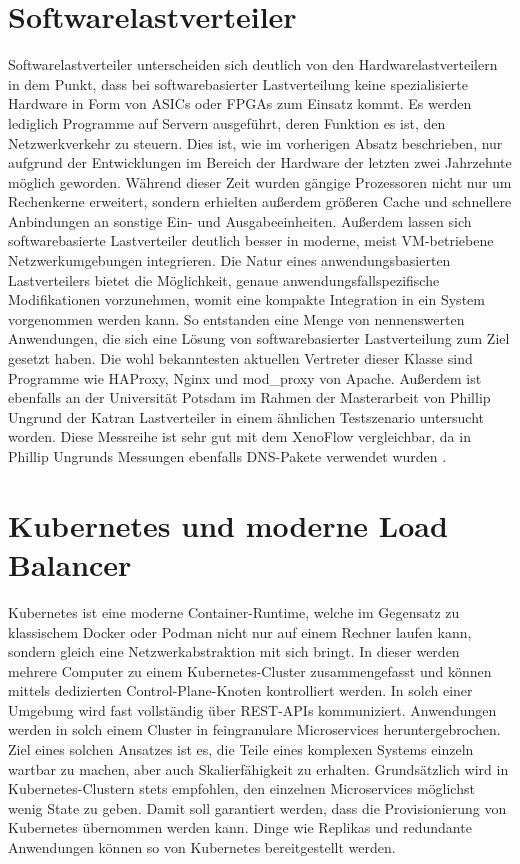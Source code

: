\section{Softwarelastverteiler}
Softwarelastverteiler unterscheiden sich deutlich von den Hardwarelastverteilern in dem Punkt, dass bei softwarebasierter Lastverteilung keine spezialisierte Hardware in Form von ASICs oder FPGAs zum Einsatz kommt. Es werden lediglich Programme auf Servern ausgeführt, deren Funktion es ist, den Netzwerkverkehr zu steuern. Dies ist, wie im vorherigen Absatz beschrieben, nur aufgrund der Entwicklungen im Bereich der Hardware der letzten zwei Jahrzehnte möglich geworden. Während dieser Zeit wurden gängige Prozessoren nicht nur um Rechenkerne erweitert, sondern erhielten außerdem größeren Cache und schnellere Anbindungen an sonstige Ein- und Ausgabeeinheiten. Außerdem lassen sich softwarebasierte Lastverteiler deutlich besser in moderne, meist VM-betriebene Netzwerkumgebungen integrieren. Die Natur eines anwendungsbasierten Lastverteilers bietet die Möglichkeit, genaue anwendungsfallspezifische Modifikationen vorzunehmen, womit eine kompakte Integration in ein System vorgenommen werden kann. \cite{softwarelb} So entstanden eine Menge von nennenswerten Anwendungen, die sich eine Lösung von softwarebasierter Lastverteilung zum Ziel gesetzt haben. Die wohl bekanntesten aktuellen Vertreter dieser Klasse sind Programme wie HAProxy, Nginx und mod\_proxy von Apache. \cite{soni2016load} Außerdem ist ebenfalls an der Universität Potsdam im Rahmen der Masterarbeit von Phillip Ungrund der Katran Lastverteiler  in einem ähnlichen Testszenario untersucht worden. Diese Messreihe ist sehr gut mit dem XenoFlow vergleichbar, da in Phillip Ungrunds Messungen ebenfalls DNS-Pakete verwendet wurden \cite{ungrund}. 
\section{Kubernetes und moderne Load Balancer}
Kubernetes ist eine moderne Container-Runtime, welche im Gegensatz zu klassischem Docker oder Podman nicht nur auf einem Rechner laufen kann, sondern gleich eine Netzwerkabstraktion mit sich bringt. In dieser werden mehrere Computer zu einem Kubernetes-Cluster zusammengefasst und können mittels dedizierten Control-Plane-Knoten kontrolliert werden. In solch einer Umgebung wird fast vollständig über REST-APIs kommuniziert. Anwendungen werden in solch einem Cluster in feingranulare Microservices heruntergebrochen. Ziel eines solchen Ansatzes ist es, die Teile eines komplexen Systems einzeln wartbar zu machen, aber auch Skalierfähigkeit zu erhalten. Grundsätzlich wird in Kubernetes-Clustern stets empfohlen, den einzelnen Microservices möglichst wenig State zu geben. Damit soll garantiert werden, dass die Provisionierung von Kubernetes übernommen werden kann. Dinge wie Replikas und redundante Anwendungen können so von Kubernetes bereitgestellt werden. \cite{vasireddy2023kubernetes}

